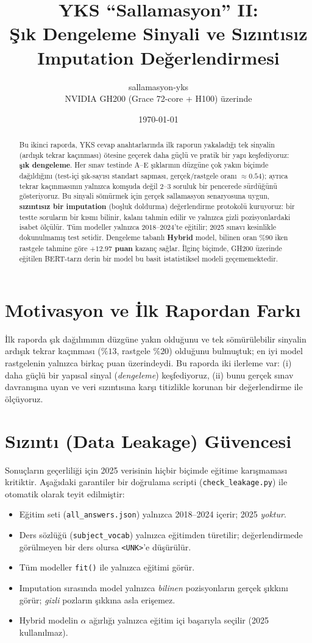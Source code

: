 \documentclass[11pt]{article}
\title{\textbf{YKS ``Sallamasyon'' II:\\
Şık Dengeleme Sinyali ve Sızıntısız Imputation Değerlendirmesi}}
\author{sallamasyon-yks \\ \small NVIDIA GH200 (Grace 72-core + H100) üzerinde}
\date{\today}
\begin{document}
\maketitle

\begin{abstract}
\noindent
Bu ikinci raporda, YKS cevap anahtarlarında ilk raporun yakaladığı tek
sinyalin (ardışık tekrar kaçınması) ötesine geçerek daha güçlü ve pratik
bir yapı keşfediyoruz: \textbf{şık dengeleme}. Her sınav testinde A--E
şıklarının düzgüne çok yakın biçimde dağıldığını (test-içi şık-sayısı
standart sapması, gerçek/rastgele oranı $\approx 0.54$); ayrıca tekrar
kaçınmasının yalnızca komşuda değil 2--3 soruluk bir pencerede sürdüğünü
gösteriyoruz. Bu sinyali sömürmek için gerçek sallamasyon senaryosuna uygun,
\textbf{sızıntısız bir imputation} (boşluk doldurma) değerlendirme protokolü
kuruyoruz: bir testte soruların bir kısmı bilinir, kalanı tahmin edilir ve
yalnızca gizli pozisyonlardaki isabet ölçülür. Tüm modeller yalnızca
2018--2024'te eğitilir; 2025 sınavı kesinlikle dokunulmamış test setidir.
Dengeleme tabanlı \textbf{Hybrid} model, bilinen oran $\%90$ iken rastgele
tahmine göre \textbf{$+12.97$ puan} kazanç sağlar. İlginç biçimde,
GH200 üzerinde eğitilen BERT-tarzı derin bir model bu basit istatistiksel
modeli geçememektedir.
\end{abstract}

\section{Motivasyon ve İlk Rapordan Farkı}
İlk raporda şık dağılımının düzgüne yakın olduğunu ve tek sömürülebilir
sinyalin ardışık tekrar kaçınması ($\%13$, rastgele $\%20$) olduğunu
bulmuştuk; en iyi model rastgelenin yalnızca birkaç puan üzerindeydi. Bu
raporda iki ilerleme var: (i) daha güçlü bir yapısal sinyal (\emph{dengeleme})
keşfediyoruz, (ii) bunu gerçek sınav davranışına uyan ve veri sızıntısına
karşı titizlikle korunan bir değerlendirme ile ölçüyoruz.

\section{Sızıntı (Data Leakage) Güvencesi}
Sonuçların geçerliliği için 2025 verisinin hiçbir biçimde eğitime
karışmaması kritiktir. Aşağıdaki garantiler bir doğrulama scripti
(\texttt{check\_leakage.py}) ile otomatik olarak teyit edilmiştir:
\begin{itemize}
  \item Eğitim seti (\texttt{all\_answers.json}) yalnızca 2018--2024 içerir;
  2025 \emph{yoktur}.
  \item Ders sözlüğü (\texttt{subject\_vocab}) yalnızca eğitimden türetilir;
  değerlendirmede görülmeyen bir ders olursa \texttt{<UNK>}'e düşürülür.
  \item Tüm modeller \texttt{fit()} ile yalnızca eğitimi görür.
  \item Imputation sırasında model yalnızca \emph{bilinen} pozisyonların
  gerçek şıkkını görür; \emph{gizli} pozların şıkkına asla erişemez.
  \item Hybrid modelin $\alpha$ ağırlığı yalnızca eğitim içi başarıyla
  seçilir (2025 kullanılmaz).
\end{itemize}
\end{document}
